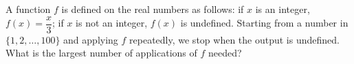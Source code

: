 A function $f$ is defined on the real numbers as follows: if $x$ is an integer, $f(x)=\dfrac x3$; if $x$ is not an integer, $f(x)$ is undefined. Starting from a number in $\{1,2,\dots,100\}$ and applying $f$ repeatedly, we stop when the output is undefined. What is the largest number of applications of $f$ needed?
